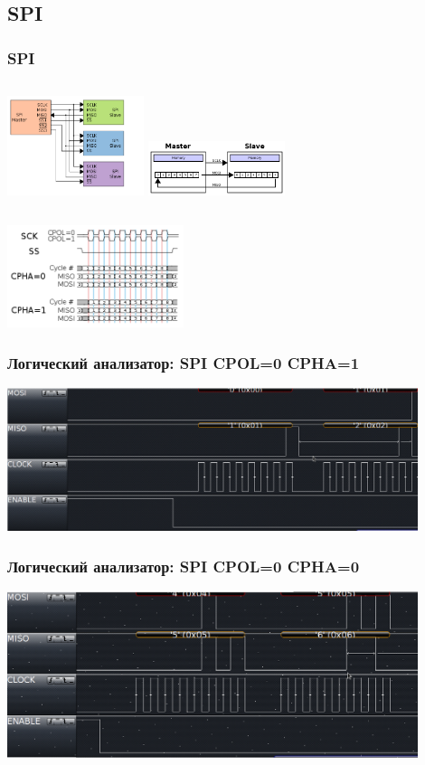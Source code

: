 \subsection{SPI}
\begin{frame}
  \frametitle{SPI}
  \begin{columns}
    \column{4cm}
    \includegraphics[width=4cm]{./slides/hardware_protocols/SPI_three_slaves.png}
    \column{4cm}
    \includegraphics[width=4cm]{./slides/hardware_protocols/SPI_8-bit_circular_transfer.png}
  \end{columns}
  \begin{center}
    \includegraphics[height=3cm]{./slides/hardware_protocols/SPI_timing_diagram2.png}
  \end{center}
\end{frame}

\begin{frame}
  \frametitle{Логический анализатор: SPI CPOL=0 CPHA=1}
  \includegraphics[width=12cm]{./slides/hardware_protocols/spi_proto_cpol0_cpha1.png}
\end{frame}

\begin{frame}
  \frametitle{Логический анализатор: SPI CPOL=0 CPHA=0}
  \includegraphics[width=12cm]{./slides/hardware_protocols/spi_proto_cpol0_cpha0.png}
\end{frame}

